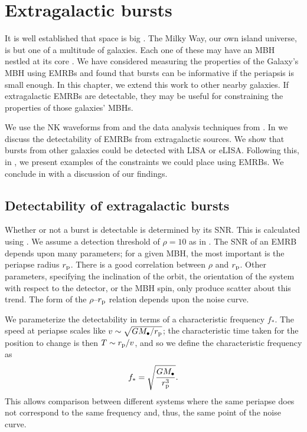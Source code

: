 \chapter{Extragalactic bursts}\label{ch:extragal}

It is well established that space is big \citep[chapter 8]{Adams1979}. The Milky Way, our own island universe, is but one of a multitude of galaxies. Each one of these may have an MBH nestled at its core \citep{Lynden-Bell1971, Soltan1982}. We have considered measuring the properties of the Galaxy's MBH using EMRBs and found that bursts can be informative if the periapsis is small enough. In this chapter, we extend this work to other nearby galaxies. If extragalactic EMRBs are detectable, they may be useful for constraining the properties of those galaxies' MBHs.

We use the NK waveforms from  and the data analysis techniques from . In  we discuss the detectability of EMRBs from extragalactic sources. We show that bursts from other galaxies could be detected with LISA or eLISA. Following this, in , we present examples of the constraints we could place using EMRBs. We conclude in  with a discussion of our findings.

\section{Detectability of extragalactic bursts}\label{sec:extragal-SNR}

Whether or not a burst is detectable is determined by its SNR. This is calculated using . We assume a detection threshold of $\rho = 10$ as in . The SNR of an EMRB depends upon many parameters; for a given MBH, the most important is the periapse radius $r_\mathrm{p}$. There is a good correlation between $\rho$ and $r_\mathrm{p}$. Other parameters, specifying the inclination of the orbit, the orientation of the system with respect to the detector, or the MBH spin, only produce scatter about this trend. The form of the $\rho$--$r_\mathrm{p}$ relation depends upon the noise curve.

We parameterize the detectability in terms of a characteristic frequency $f_\ast$. The speed at periapse scales like $v \sim \sqrt{GM_\bullet/r_\mathrm{p}}$; the characteristic time taken for the position to change is then $T \sim r_\mathrm{p}/v$, and so we define the characteristic frequency as
\begin{equation}
f_\ast = \sqrt{\dfrac{GM_\bullet}{r_\mathrm{p}^3}}.
\end{equation}
This allows comparison between different systems where the same periapse does not correspond to the same frequency and, thus, the same point of the noise curve.

